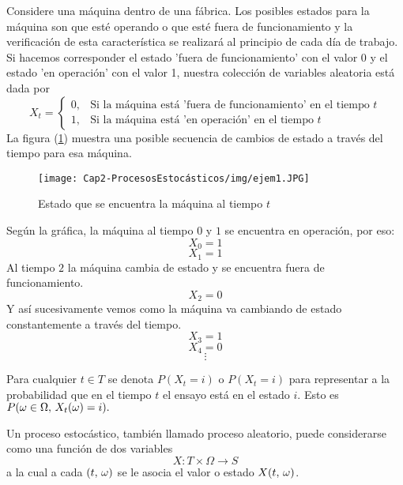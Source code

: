 \begin{Ejm}
    Considere una máquina dentro de una fábrica. Los
    posibles estados para la máquina son que esté operando o que esté fuera de funcionamiento
    y la verificación de esta característica se realizará al principio de cada día de trabajo. Si
    hacemos corresponder el estado 'fuera de funcionamiento' con el valor 0 y el estado 'en operación' con el valor 1, nuestra colección de variables aleatoria está dada por 
    $$X_t=
    \label{ejm-procEstocástico}
    \begin{cases}
        0, & \mbox{Si la máquina está 'fuera de funcionamiento' en el tiempo $t$}\\
        1, & \mbox{Si la máquina está 'en operación' en el tiempo $t$}
    \end{cases}$$
    La figura (\ref{fig-procesoEstocástico-Ejemplo}) muestra una posible secuencia de cambios de estado a través del tiempo para esa máquina.
    \begin{center}
        \begin{figure}[htb]
            \begin{center}
             \texttt{[image: Cap2-ProcesosEstocásticos/img/ejem1.JPG]}
                \vspace*{0.05in}
            \end{center}
            \caption{Estado que se encuentra la máquina al tiempo $t$ }
            \label{fig-procesoEstocástico-Ejemplo}
        \end{figure}
    \end{center}
    Según la gráfica, la máquina al tiempo $0$ y $1$ se encuentra en operación, por eso:
    $$X_0=1$$
    $$X_1=1$$
    Al tiempo $2$ la máquina cambia de estado y se encuentra fuera de funcionamiento. 
    $$X_2=0$$
    Y así sucesivamente vemos como la máquina va cambiando de estado constantemente a través del tiempo.
    $$X_3=1$$
    $$X_4=0$$
    $$\vdots$$
\end{Ejm}
\begin{Obs}
Para cualquier $t\in T$ se denota $P(X_t=i)$ o $P(X_t=i)$ para representar a la probabilidad que en el tiempo $t$ el ensayo está en el estado $i$. Esto es  $P(\omega\in\Omega,\thinspace X_t(\omega)=i).$
\end{Obs}
Un proceso estocástico, también llamado proceso aleatorio, puede considerarse como una función de dos variables
$$X:T\times\Omega\rightarrow S$$ a la cual a cada $(t,\thinspace\omega)$ se le asocia el valor o estado $X (t,\thinspace\omega) $.\\
